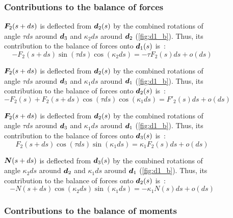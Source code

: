 \begin{figure}[p]
	\begin{fullpage}
	\subsubsection{Contributions to the balance of forces}
	\vspace{10pt}
	
	$\boldsymbol{F}_2(s+ds)$ is deflected from $\boldsymbol{d}_2(s)$ by the combined rotations of angle $\tau ds$ around $\boldsymbol{d}_3$ and $\kappa_2 ds$ around $\boldsymbol{d}_2$ (\cref{fig:d1_b}). Thus, its contribution to the balance of forces onto $\boldsymbol{d}_1(s)$ is~: 
	\begin{equation*}
		-F_2(s+ds) \sin(\tau ds) \cos(\kappa_2 ds) = -\tau F_2(s) ds + o(ds)
	\end{equation*}	
	
	$\boldsymbol{F}_2(s+ds)$ is deflected from $\boldsymbol{d}_2(s)$ by the combined rotations of angle $\tau ds$ around $\boldsymbol{d}_3$ and $\kappa_1 ds$ around $\boldsymbol{d}_1$ (\cref{fig:d1_b}). Thus, its contribution to the balance of forces onto $\boldsymbol{d}_2(s)$ is~: 
	\begin{equation*}
		-F_2(s) + F_2(s+ds) \cos(\tau ds) \cos(\kappa_1 ds) = F'_2 (s) ds + o(ds)
	\end{equation*}	
	
	$\boldsymbol{F}_2(s+ds)$ is deflected from $\boldsymbol{d}_2(s)$ by the combined rotations of angle $\tau ds$ around $\boldsymbol{d}_3$ and $\kappa_1 ds$ around $\boldsymbol{d}_1$ (\cref{fig:d1_b}). Thus, its contribution to the balance of forces onto $\boldsymbol{d}_3(s)$ is~: 
	\begin{equation*}
		F_2(s+ds) \cos(\tau ds) \sin(\kappa_1 ds) = \kappa_1 F_2(s) ds + o(ds)
	\end{equation*}
		
	$\boldsymbol{N}(s+ds)$ is deflected from $\boldsymbol{d}_3(s)$ by the combined rotations of angle $\kappa_2 ds$ around $\boldsymbol{d}_2$ and $\kappa_1 ds$ around $\boldsymbol{d}_1$ (\cref{fig:d1_b}). Thus, its contribution to the balance of forces onto $\boldsymbol{d}_2(s)$ is~: 
	\begin{equation*}
		-N(s+ds) \cos(\kappa_2 ds) \sin(\kappa_1 ds) = -\kappa_1 N(s) ds + o(ds)
	\end{equation*}	
	\vspace{10pt}

	\subsubsection{Contributions to the balance of moments}
	\vspace{10pt}
	

\end{fullpage}
\end{figure}
